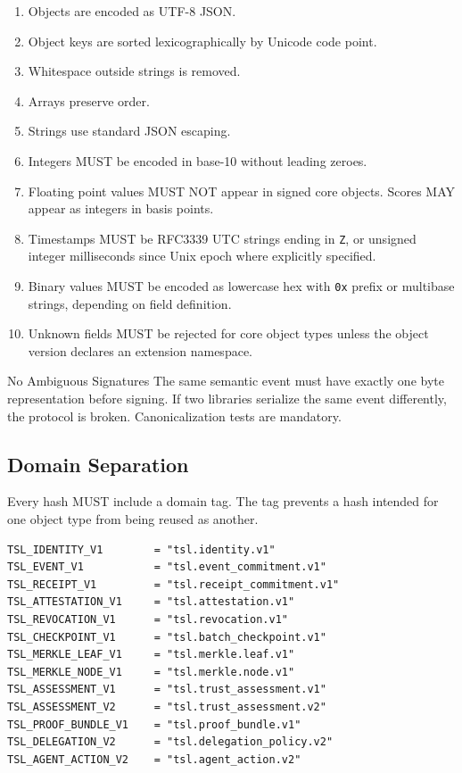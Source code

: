 \documentclass[11pt]{article}
\begin{document}
\begin{enumerate}
    \item Objects are encoded as UTF-8 JSON.
    \item Object keys are sorted lexicographically by Unicode code point.
    \item Whitespace outside strings is removed.
    \item Arrays preserve order.
    \item Strings use standard JSON escaping.
    \item Integers MUST be encoded in base-10 without leading zeroes.
    \item Floating point values MUST NOT appear in signed core objects. Scores MAY appear as integers in basis points.
    \item Timestamps MUST be RFC3339 UTC strings ending in \texttt{Z}, or unsigned integer milliseconds since Unix epoch where explicitly specified.
    \item Binary values MUST be encoded as lowercase hex with \texttt{0x} prefix or multibase strings, depending on field definition.
    \item Unknown fields MUST be rejected for core object types unless the object version declares an extension namespace.
\end{enumerate}

\begin{warningbox}{No Ambiguous Signatures}
The same semantic event must have exactly one byte representation before signing. If two libraries serialize the same event differently, the protocol is broken. Canonicalization tests are mandatory.
\end{warningbox}

\subsection{Domain Separation}

Every hash MUST include a domain tag. The tag prevents a hash intended for one object type from being reused as another.

\begin{lstlisting}[style=tslcode]
TSL_IDENTITY_V1        = "tsl.identity.v1"
TSL_EVENT_V1           = "tsl.event_commitment.v1"
TSL_RECEIPT_V1         = "tsl.receipt_commitment.v1"
TSL_ATTESTATION_V1     = "tsl.attestation.v1"
TSL_REVOCATION_V1      = "tsl.revocation.v1"
TSL_CHECKPOINT_V1      = "tsl.batch_checkpoint.v1"
TSL_MERKLE_LEAF_V1     = "tsl.merkle.leaf.v1"
TSL_MERKLE_NODE_V1     = "tsl.merkle.node.v1"
TSL_ASSESSMENT_V1      = "tsl.trust_assessment.v1"
TSL_ASSESSMENT_V2      = "tsl.trust_assessment.v2"
TSL_PROOF_BUNDLE_V1    = "tsl.proof_bundle.v1"
TSL_DELEGATION_V2      = "tsl.delegation_policy.v2"
TSL_AGENT_ACTION_V2    = "tsl.agent_action.v2"
\end{lstlisting}
\end{document}
